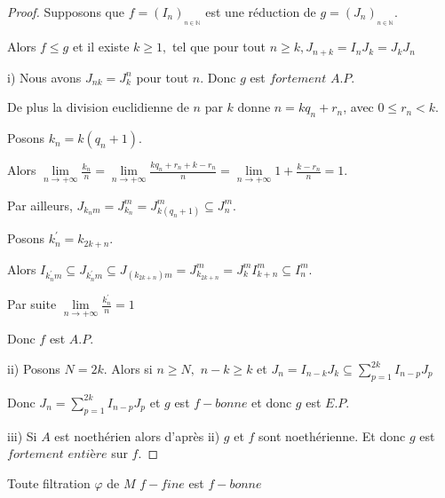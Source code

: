 \begin{proof}
	Supposons que $f=(I_{n})_{_{n\in \mathbb{N}}}$ est une réduction de $g=(J_{n})_{_{n\in \mathbb{N}}}.$
	
	Alors $f\leq g$ et il existe $k\geq 1,$ tel que pour tout $n\geq k,J_{n+k}=I_{n}J_{k}=J_{k}J_{n}$
	
	i) Nous avons $J_{nk}=J_{k}^{n}$ pour tout $n.$ Donc $g$ est $fortement$ $A.P.$
	
	De plus la division euclidienne de $n$ par $k$ donne $n=kq_{n}+r_{n}$, avec $0\leq r_{n}<k.$
	
	Posons $k_{n}=k(q_{n}+1).$
	
	Alors $\underset{n\longrightarrow +\infty }{\lim }\frac{k_{n}}{n}=\underset{n\longrightarrow +\infty }{\lim }\frac{kq_{n}+r_{n}+k-r_{n}}{n}=\underset{n\longrightarrow +\infty }{\lim }1+\frac{k-r_{n}}{n}=1.$
	
	Par ailleurs, $J_{k_{n}m}=J_{k_{n}}^{m}=J_{k(q_{n}+1)}^{m}\subseteq J_{n}^{m}.$
	
	Posons $k_{n}^{\prime }=k_{2k+n}.$
	
	Alors $I_{k_{n}^{\prime }m}\subseteq J_{k_{n}^{\prime }m}\subseteq
	J_{(k_{2k+n})m}=J_{k_{2k+n}}^{m}=J_{k}^{m}I_{k+n}^{m}\subseteq I_{n}^{m}.$
	
	Par suite $\underset{n\longrightarrow +\infty }{\lim }\frac{k_{n}^{\prime }}{n}=1$
	
	Donc $f$ est $A.P.$
	
	
	ii) Posons $N=2k.$ Alors si $n\geq N,$ $n-k\geq k$ et $J_{n}=I_{n-k}J_{k}\subseteq \sum\limits_{p=1}^{2k}I_{n-p}J_{p}$
	
	Donc $J_{n}=\sum\limits_{p=1}^{2k}I_{n-p}J_{p}$ et $g$ est $f-bonne$ et donc $g$ est $E.P.$
	
	iii) Si $A$ est noethérien alors d'après ii) $g$ et $f$ sont noethérienne. Et donc $g$ est $fortement$ $entière$ sur $f.$
	
\end{proof}
\begin{maproposition}
	\label{maprop3}
	Toute filtration $\varphi$ de $M$ $f-fine$ est $f-bonne$
\end{maproposition}

